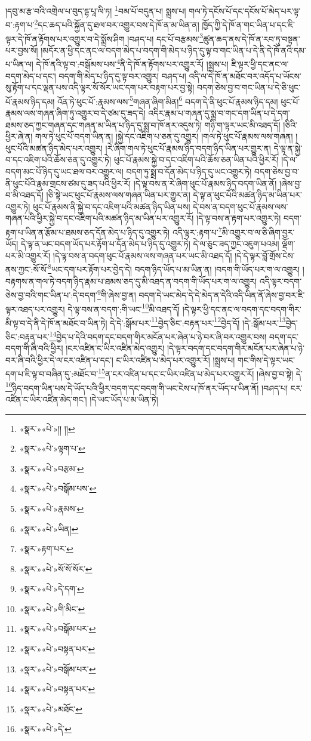 །དབུ་མ་རྩ་བའི་འགྲེལ་པ་བུད་དྷ་པཱ་ལི་ཏ། \footnote{«སྣར་»«པེ་»།། །། }བམ་པོ་བདུན་པ། སྨྲས་པ། གལ་ཏེ་དངོས་པོ་དང་དངོས་པོ་མེད་པར་ལྟ་བ་:རྟག་པ་\footnote{«སྣར་»«པེ་»ལྟག་པ་}དང་ཆད་པའི་སྐྱོན་དུ་ཐལ་བར་འགྱུར་བས་དེ་ཁོ་ན་མ་ཡིན་ན། ཁྱོད་ཀྱི་དེ་ཁོ་ན་གང་ཡིན་པ་དང་ཇི་ལྟར་དེ་ཁོ་ན་རྟོགས་པར་འགྱུར་བ་དེ་སྨྲོས་ཤིག །བཤད་པ། དང་པོ་བརྩམས་\footnote{«སྣར་»«པེ་»བརྩམ་}ཚུན་ཆད་ནས་དེ་ཁོ་ན་རབ་ཏུ་བསྟན་པར་བྱས་སོ། །མདོར་ན་ཕྱི་དང་ནང་ལ་བདག་མེད་པ་བདག་གི་མེད་པ་ཉིད་དུ་ལྟ་བ་གང་ཡིན་པ་དེ་ནི་དེ་ཁོ་ནའི་དམ་པ་ཡིན་ལ། དེ་ཁོ་ནའི་ལྟ་བ་:བསྒོམས་པས་\footnote{«སྣར་»«པེ་»བསྒོམ་པས་}ནི་དེ་ཁོ་ན་རྟོགས་པར་འགྱུར་རོ། །སྨྲས་པ། ཇི་ལྟར་ཕྱི་དང་ནང་ལ་བདག་མེད་པ་དང་། བདག་གི་མེད་པ་ཉིད་དུ་ལྟ་བར་འགྱུར། བཤད་པ། འདི་ལ་དེ་ཁོ་ན་མཐོང་བར་འདོད་པ་ཡོངས་སུ་རྟོག་པ་དང་ལྡན་པས་འདི་ལྟར་སོ་སོར་ཡང་དག་པར་བརྟག་པར་བྱ་སྟེ། བདག་ཅེས་བྱ་བ་གང་ཡིན་པ་དེ་ཅི་ཕུང་པོ་རྣམས་ཉིད་དམ། འོན་ཏེ་ཕུང་པོ་:རྣམས་ལས་\footnote{«སྣར་»«པེ་»རྣམས་}གཞན་ཞིག་མིན།\footnote{«སྣར་»«པེ་»ཡིན།} བདག་དེ་ནི་ཕུང་པོ་རྣམས་ཉིད་དམ། ཕུང་པོ་རྣམས་ལས་གཞན་ཞིག་ཏུ་འགྱུར་བ་དེ་ཙམ་དུ་ཟད་དེ། འདིར་རྣམ་པ་གཞན་དུ་སྨྲ་བ་གང་དག་ཡིན་པ་དེ་དག་ཐམས་ཅད་ཀྱང་གཞན་དང་གཞན་མ་ཡིན་པ་ཉིད་དུ་སྨྲ་བ་ཁོ་ནར་འདུས་ཏེ། གཉི་ག་ལྟར་ཡང་མི་འཐད་དོ། །ཅིའི་ཕྱིར་ཞེ་ན། གལ་ཏེ་ཕུང་པོ་བདག་ཡིན་ན། །སྐྱེ་དང་འཇིག་པ་ཅན་དུ་འགྱུར། །གལ་ཏེ་ཕུང་པོ་རྣམས་ལས་གཞན། །ཕུང་པོའི་མཚན་ཉིད་མེད་པར་འགྱུར། །རེ་ཞིག་གལ་ཏེ་ཕུང་པོ་རྣམས་ཉིད་བདག་ཉིད་ཡིན་པར་གྱུར་ན། དེ་ལྟ་ན་སྐྱེ་བ་དང་འཇིག་པའི་ཆོས་ཅན་དུ་འགྱུར་ཏེ། ཕུང་པོ་རྣམས་སྐྱེ་བ་དང་འཇིག་པའི་ཆོས་ཅན་ཡིན་པའི་ཕྱིར་རོ། །དེ་ལ་བདག་མང་པོ་ཉིད་དུ་ཡང་ཐལ་བར་འགྱུར་ལ། བདག་ཏུ་སྨྲ་བ་དོན་མེད་པ་ཉིད་དུ་ཡང་འགྱུར་ཏེ། བདག་ཅེས་བྱ་བ་ནི་ཕུང་པོའི་རྣམ་གྲངས་ཙམ་དུ་ཟད་པའི་ཕྱིར་རོ། །དེ་ལྟ་བས་ན་རེ་ཞིག་ཕུང་པོ་རྣམས་ཉིད་བདག་ཡིན་ནོ། །ཞེས་བྱ་བ་མི་འཐད་དོ། །ཅི་སྟེ་ཡང་ཕུང་པོ་རྣམས་ལས་གཞན་ཡིན་པར་གྱུར་ན། དེ་ལྟ་ན་ཕུང་པོའི་མཚན་ཉིད་མ་ཡིན་པར་འགྱུར་ཏེ། ཕུང་པོ་རྣམས་ནི་སྐྱེ་བ་དང་འཇིག་པའི་མཚན་ཉིད་ཡིན་པས། དེ་བས་ན་བདག་ཕུང་པོ་རྣམས་ལས་གཞན་པའི་ཕྱིར་སྐྱེ་བ་དང་འཇིག་པའི་མཚན་ཉིད་མ་ཡིན་པར་འགྱུར་རོ། །དེ་ལྟ་བས་ན་རྟག་པར་འགྱུར་ཏེ། བདག་རྟག་པ་ཡིན་ན་རྩོམ་པ་ཐམས་ཅད་དོན་མེད་པ་ཉིད་དུ་འགྱུར་ཏེ། འདི་ལྟར་:རྟག་པ་\footnote{«སྣར་»རྟག་པར་}མི་འགྱུར་བ་ལ་ཅི་ཞིག་བྱར་ཡོད། དེ་ལྟ་ན་ཡང་བདག་ཡོད་པར་རྟོག་པ་དོན་མེད་པ་ཉིད་དུ་འགྱུར་ཏེ། དེ་ལ་ཅུང་ཟད་ཀྱང་འཇུག་པའམ། ལྡོག་པར་མི་འགྱུར་རོ། །དེ་ལྟ་བས་ན་བདག་ཕུང་པོ་རྣམས་ལས་གཞན་པར་ཡང་མི་འཐད་དོ། །དེ་དེ་ལྟར་བློ་གྲོས་ངེས་ནས་ཀྱང་:སོ་སོ་\footnote{«སྣར་»«པེ་»སོ་སོ་སོར་}ཡང་དག་པར་རྟོག་པར་བྱེད་དེ། བདག་ཉིད་ཡོད་པ་མ་ཡིན་ན། །བདག་གི་ཡོད་པར་ག་ལ་འགྱུར། །བརྟགས་ན་གལ་ཏེ་བདག་ཉིད་རྣམ་པ་ཐམས་ཅད་དུ་མི་འཐད་ན་བདག་གི་ཡོད་པར་ག་ལ་འགྱུར། འདི་ལྟར་བདག་ཅེས་བྱ་བའི་གང་ཡིན་པ་:དེ་བདག་\footnote{«སྣར་»«པེ་»དེ་དག་}གི་ཞེས་བྱ་ན། བདག་དེ་ཡང་མེད་དེ་དེ་མེད་ན་དེའི་འདི་ཡིན་ནོ་ཞེས་བྱ་བར་ཇི་ལྟར་འཐད་པར་འགྱུར། དེ་ལྟ་བས་ན་བདག་:གི་ཡང་\footnote{«སྣར་»«པེ་»གི་མིང་}མི་འཐད་དོ། །དེ་ལྟར་ཕྱི་དང་ནང་ལ་བདག་དང་བདག་གིར་མི་ལྟ་བ་དེ་ནི་དེ་ཁོ་ན་མཐོང་བ་ཡིན་ཏེ། དེ་དེ་:སྒོམ་པར་\footnote{«སྣར་»«པེ་»བསྒོམ་པར་}བྱེད་ཅིང་:བརྟན་པར་\footnote{«སྣར་»«པེ་»བསྟན་པར་}བྱེད་དོ། །དེ་:སྒོམ་པར་\footnote{«སྣར་»«པེ་»བསྒོམ་པར་}བྱེད་ཅིང་:བརྟན་པར་\footnote{«སྣར་»«པེ་»བསྟན་པར་}བྱེད་པ་དེའི་བདག་དང་བདག་གིར་མངོན་པར་ཞེན་པ་ཉེ་བར་ཞི་བར་འགྱུར་བས། བདག་དང་བདག་གི་ཞི་བའི་ཕྱིར། །ངར་འཛིན་ང་ཡིར་འཛིན་མེད་འགྱུར། །དེ་ལྟར་བདག་དང་བདག་གིར་མངོན་པར་ཞེན་པ་ཉེ་བར་ཞི་བའི་ཕྱིར་དེ་ལ་ངར་འཛིན་པ་དང་། ང་ཡིར་འཛིན་པ་མེད་པར་འགྱུར་རོ། །སྨྲས་པ། གང་གིས་དེ་ལྟར་ཡང་དག་པ་ཇི་ལྟ་བ་བཞིན་དུ་:མཐོང་བ་\footnote{«སྣར་»«པེ་»མཐོང་}ན་ངར་འཛིན་པ་དང་ང་ཡིར་འཛིན་པ་མེད་པར་འགྱུར་རོ། །ཞེས་བྱ་བ་སྟེ། དེ་\footnote{«སྣར་»«པེ་»དེ་}ཉིད་བདག་ཡིན་པས་དེ་ཡོད་པའི་ཕྱིར་བདག་དང་བདག་གི་ཡང་ངེས་པ་ཁོ་ནར་ཡོད་པ་ཡིན་ནོ། །བཤད་པ། ངར་འཛིན་ང་ཡིར་འཛིན་མེད་གང་། །དེ་ཡང་ཡོད་པ་མ་ཡིན་ཏེ། 